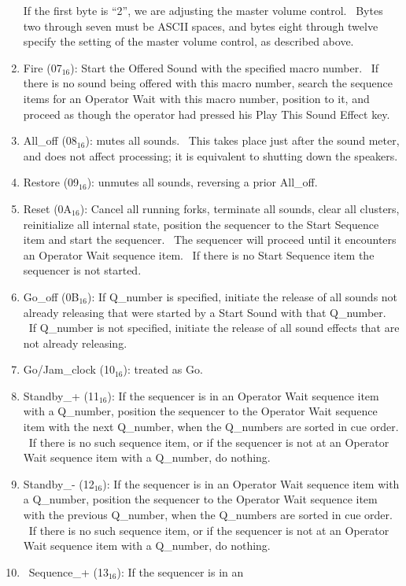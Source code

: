 \documentclass[letterpaper]{article}
\newcommand\textsubscript[1]{\ensuremath{{}_{\text{#1}}}}
\begin{document}
\begin{enumerate}
If the first byte is “2”, we are adjusting the master volume control.
\ Bytes two through seven must be ASCII spaces, and bytes eight through
twelve specify the setting of the master volume control, as described
above.
\item Fire (07\textsubscript{16}): Start the Offered Sound with the
specified macro number. \ If there is no sound being offered with this
macro number, search the sequence items for an Operator Wait with this
macro number, position to it, and proceed as though the operator had
pressed his Play This Sound Effect key.
\item All\_off (08\textsubscript{16}): mutes all sounds. \ This takes
place just after the sound meter, and does not affect processing; it is
equivalent to shutting down the speakers.
\item Restore (09\textsubscript{16}): unmutes all sounds, reversing a
prior All\_off.
\item Reset (0A\textsubscript{16}): Cancel all running forks, terminate
all sounds, clear all clusters, reinitialize all internal state,
position the sequencer to the Start Sequence item and start the
sequencer. \ The sequencer will proceed until it encounters an Operator
Wait sequence item. \ If there is no Start Sequence item the sequencer
is not started.
\item Go\_off (0B\textsubscript{16}): If Q\_number is specified,
initiate the release of all sounds not already releasing that were
started by a Start Sound with that Q\_number. \ If Q\_number is not
specified, initiate the release of all sound effects that are not
already releasing.
\item Go/Jam\_clock (10\textsubscript{16}): treated as Go.
\item Standby\_+ (11\textsubscript{16}): If the sequencer is in an
Operator Wait sequence item with a Q\_number, position the sequencer to
the Operator Wait sequence item with the next Q\_number, when the
Q\_numbers are sorted in cue order. \ If there is no such sequence
item, or if the sequencer is not at an Operator Wait sequence item with
a Q\_number, do nothing.
\item Standby\_- (12\textsubscript{16}): If the sequencer is in an
Operator Wait sequence item with a Q\_number, position the sequencer to
the Operator Wait sequence item with the previous Q\_number, when the
Q\_numbers are sorted in cue order. \ If there is no such sequence
item, or if the sequencer is not at an Operator Wait sequence item with
a Q\_number, do nothing.
\item \ Sequence\_+ (13\textsubscript{16}): If the sequencer is in an

\end{enumerate}
\end{document}
